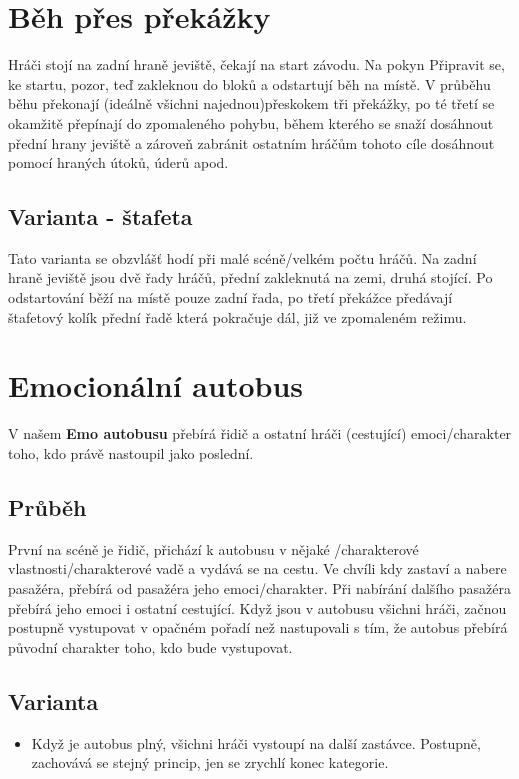 \needspace{5cm} \section{Běh přes překážky} \label{běh přes překážky} Hráči stojí na zadní hraně jeviště, čekají na start závodu. Na pokyn  Připravit se, ke startu, pozor, teď   zakleknou do bloků a odstartují běh na místě. V průběhu běhu překonají (ideálně všichni najednou)přeskokem tři překážky, po té třetí se okamžitě přepínají do zpomaleného pohybu, během kterého se snaží dosáhnout přední hrany jeviště a zároveň zabránit ostatním hráčům tohoto cíle dosáhnout pomocí hraných útoků, úderů apod. 
 
\subsection{Varianta - štafeta} Tato varianta se obzvlášť hodí při malé scéně/velkém počtu hráčů. 
Na zadní hraně jeviště jsou dvě řady hráčů, přední zakleknutá na zemi, druhá stojící. Po odstartování běží na místě pouze zadní řada, po třetí překážce předávají štafetový kolík přední řadě která pokračuje dál, již ve zpomaleném režimu. 
 
 
 
 
\needspace{5cm} \section{Emocionální autobus} \label{emocionální autobus}  
 
V našem \textbf{Emo autobusu}{} přebírá řidič a ostatní hráči (cestující) emoci/charakter toho, kdo právě nastoupil jako poslední.  
 
\subsection{Průběh} První na scéně je řidič, přichází k autobusu v nějaké /charakterové vlastnosti/charakterové vadě a vydává se na cestu. Ve chvíli kdy zastaví a nabere pasažéra, přebírá od pasažéra jeho emoci/charakter. Při nabírání dalšího pasažéra přebírá jeho emoci i ostatní cestující. Když jsou v autobusu všichni hráči, začnou postupně vystupovat v opačném pořadí než nastupovali s tím, že autobus přebírá původní charakter toho, kdo bude vystupovat. 
 
\subsection{Varianta} \begin{itemize}
\item Když je autobus plný, všichni hráči vystoupí na další zastávce. Postupně, zachovává se stejný princip, jen se zrychlí konec kategorie.
\end{itemize}
 
